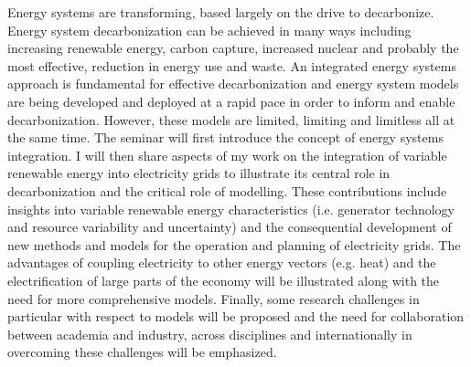 Energy systems are transforming, based largely on the drive to decarbonize. Energy system decarbonization can be achieved in many ways including increasing renewable energy, carbon capture, increased nuclear and probably the most effective, reduction in energy use and waste.
An integrated energy systems approach is fundamental for effective decarbonization and energy system models are being developed and deployed at a rapid pace in order to inform and enable decarbonization.
However, these models are limited, limiting and limitless all at the same time.
The seminar will first introduce the concept of energy systems integration.
I will then share aspects of my work on the integration of variable renewable energy into electricity grids to illustrate its central role in decarbonization and the critical role of modelling.
These contributions include insights into variable renewable energy characteristics (i.e. generator technology and resource variability and uncertainty) and the consequential development of new methods and models for the operation and planning of electricity grids.
The advantages of coupling electricity to other energy vectors (e.g. heat) and the electrification of large parts of the economy will be illustrated along with the need for more comprehensive models.
Finally, some research challenges in particular with respect to models will be proposed and the need for collaboration between academia and industry, across disciplines and internationally in overcoming these challenges will be emphasized.
